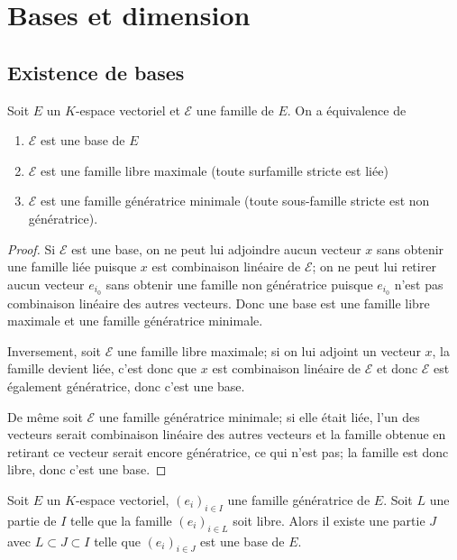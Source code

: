 \section{Bases et dimension}

\subsection{Existence de bases}

\begin{lem}[fondamental]
Soit $E$ un $K$-espace vectoriel et $\mathcal{E}$ une famille de $E$. On a équivalence de 
\begin{enumerate}
\item $\mathcal{E}$ est une  base de $E$ 
\item $\mathcal{E}$ est une  famille libre maximale (toute surfamille stricte est liée) 
\item $\mathcal{E}$ est une  famille génératrice minimale (toute sous-famille stricte est non génératrice).
\end{enumerate}
\end{lem}

\begin{proof}
Si $\mathcal{E}$ est une base, on ne peut lui adjoindre aucun vecteur $x$ sans obtenir une famille liée puisque $x$ est combinaison linéaire de $\mathcal{E}$; on ne peut lui retirer aucun vecteur $e_{i_0}$ sans obtenir une famille non génératrice puisque $e_{i_0}$ n'est pas combinaison linéaire des autres vecteurs. Donc une base est une famille libre maximale et une famille génératrice minimale.

Inversement, soit $\mathcal{E}$ une famille libre maximale; si on lui adjoint un vecteur $x$, la famille devient liée, c'est donc que $x$ est combinaison linéaire de $\mathcal{E}$ et donc $\mathcal{E}$ est également génératrice, donc c'est une base.

De même soit $\mathcal{E}$ une famille génératrice minimale; si elle était liée, l'un des vecteurs serait combinaison linéaire des autres vecteurs et la famille obtenue en retirant ce vecteur serait encore génératrice, ce qui n'est pas; la famille est donc libre, donc c'est une base.
\end{proof}

\begin{thm}
Soit $E$ un $K$-espace vectoriel, $(e_i)_{i\in I}$ une famille génératrice de $E$. Soit $L$ une partie de $I$ telle que la famille $(e_i)_{i\in L}$ soit libre. Alors il existe une partie $J$ avec $L \subset J \subset I$ telle que $(e_i)_{i\in J}$ est une base de $E$.
\end{thm}

